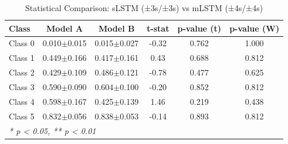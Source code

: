 \begin{table}[htbp]
\centering
\caption{Statistical Comparison: sLSTM (±3s/±3s) vs mLSTM (±4s/±4s)}
\label{tab:comparison_class_slstm_±3s_±3s_vs_mlstm_±4s_±4s}
\begin{tabular}{lccccc}
\toprule
\textbf{Class} & \textbf{Model A} & \textbf{Model B} & \textbf{t-stat} & \textbf{p-value (t)} & \textbf{p-value (W)} \\
\midrule
Class 0 & 0.010$\pm$0.015 & 0.015$\pm$0.027 & -0.32 & 0.762 & 1.000 \\
Class 1 & 0.449$\pm$0.166 & 0.417$\pm$0.161 & 0.43 & 0.688 & 0.812 \\
Class 2 & 0.429$\pm$0.109 & 0.486$\pm$0.121 & -0.78 & 0.477 & 0.625 \\
Class 3 & 0.590$\pm$0.090 & 0.604$\pm$0.100 & -0.20 & 0.852 & 0.812 \\
Class 4 & 0.598$\pm$0.167 & 0.425$\pm$0.139 & 1.46 & 0.219 & 0.438 \\
Class 5 & 0.832$\pm$0.056 & 0.838$\pm$0.053 & -0.14 & 0.893 & 0.812 \\
\bottomrule
\multicolumn{6}{l}{\textit{* p < 0.05, ** p < 0.01}} \\
\end{tabular}
\end{table}